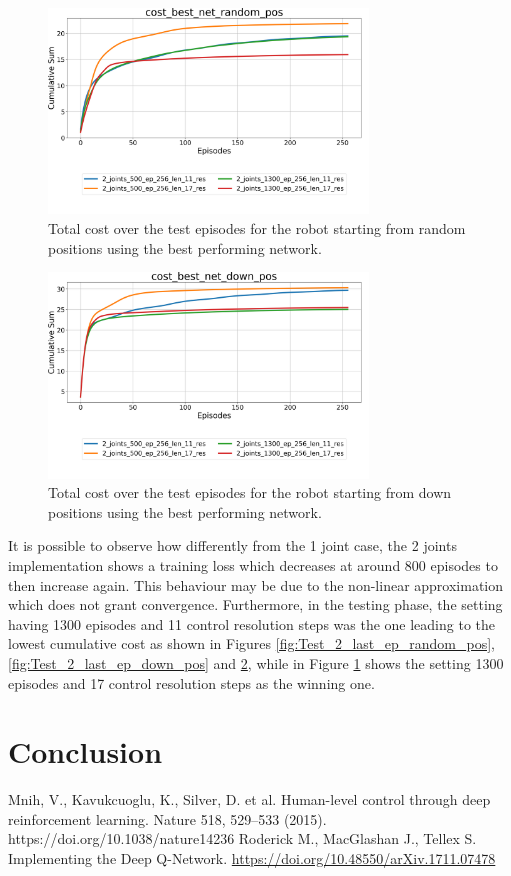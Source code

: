 \documentclass[twocolumn, a4paper]{article}
\begin{document}
\begin{figure}[H]
	\centering
	\includegraphics[width=8.5cm]{"../Figures/Summary_cost_best_net_random_pos_2J.png"}
	\caption{Total cost over the test episodes for the robot starting from
			 random positions using the best performing network.}
	\label{fig:Test_2_best_net_random_pos}
\end{figure}
\vspace{-1cm}
\begin{figure}[H]
	\centering
	\includegraphics[width=8.5cm]{"../Figures/Summary_cost_best_net_down_pos_2J.png"}
	\caption{Total cost over the test episodes for the robot starting from
			 down positions using the best performing network.}
	\label{fig:Test_2_best_net_down_pos}
	\end{figure}
It is possible to observe how differently from the 1 joint case, the 2 joints
implementation shows a training loss which decreases at around 800 episodes
to then increase again. This behaviour may be due to the non-linear
approximation which does not grant convergence.
Furthermore, in the testing phase, the setting having 1300 episodes and 11
control resolution steps was the one leading to the lowest cumulative cost
as shown in Figures \ref{fig:Test_2_last_ep_random_pos}, \ref{fig:Test_2_last_ep_down_pos} and
\ref{fig:Test_2_best_net_down_pos}, while in Figure \ref{fig:Test_2_best_net_random_pos}
shows the setting 1300 episodes and 17 control resolution steps as the winning one.
\newpage

\section{Conclusion}

\begin{thebibliography}{9}
	Mnih, V., Kavukcuoglu, K., Silver, D. et al. Human-level control through
	deep reinforcement learning. Nature 518, 529–533 (2015).
	https://doi.org/10.1038/nature14236
	Roderick M., MacGlashan J., Tellex S. Implementing the Deep Q-Network.
	\href{https://doi.org/10.48550/arXiv.1711.07478}
		 {https://doi.org/10.48550/arXiv.1711.07478}
\end{thebibliography}
\end{document}
